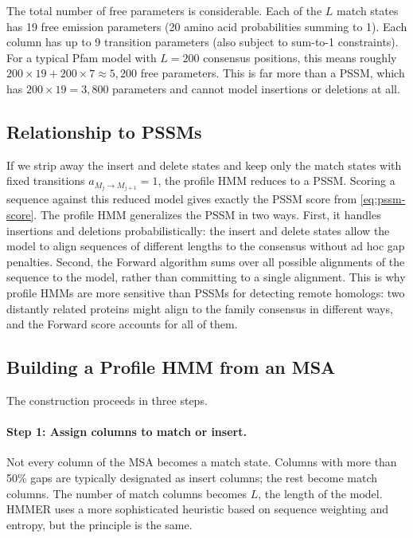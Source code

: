 The total number of free parameters is considerable.
Each of the $L$ match states has 19 free emission parameters (20 amino acid probabilities summing to 1).
Each column has up to 9 transition parameters (also subject to sum-to-1 constraints).
For a typical Pfam model with $L = 200$ consensus positions, this means roughly $200 \times 19 + 200 \times 7 \approx 5{,}200$ free parameters.
This is far more than a PSSM, which has $200 \times 19 = 3{,}800$ parameters and cannot model insertions or deletions at all.

\subsection{Relationship to PSSMs}
\label{sec:profile-vs-pssm}

If we strip away the insert and delete states and keep only the match states with fixed transitions $a_{M_j \to M_{j+1}} = 1$, the profile HMM reduces to a PSSM.
Scoring a sequence against this reduced model gives exactly the PSSM score from \cref{eq:pssm-score}.
The profile HMM generalizes the PSSM in two ways.
First, it handles insertions and deletions probabilistically: the insert and delete states allow the model to align sequences of different lengths to the consensus without ad hoc gap penalties.
Second, the Forward algorithm sums over all possible alignments of the sequence to the model, rather than committing to a single alignment.
This is why profile HMMs are more sensitive than PSSMs for detecting remote homologs: two distantly related proteins might align to the family consensus in different ways, and the Forward score accounts for all of them.

\subsection{Building a Profile HMM from an MSA}
\label{sec:build-profile}

The construction proceeds in three steps.

\paragraph{Step 1: Assign columns to match or insert.}
Not every column of the MSA becomes a match state.
Columns with more than 50\% gaps are typically designated as insert columns; the rest become match columns.
The number of match columns becomes $L$, the length of the model.
HMMER uses a more sophisticated heuristic based on sequence weighting and entropy, but the principle is the same.

